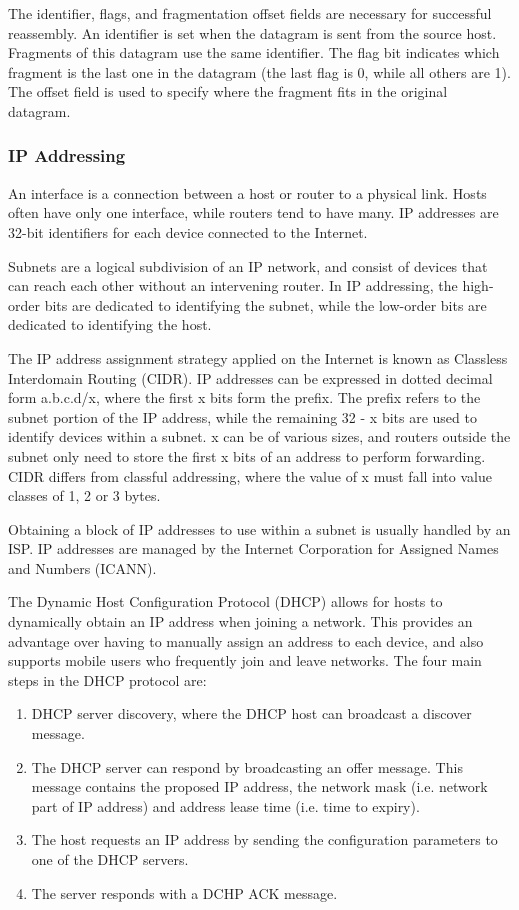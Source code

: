 \documentclass[12pt,titlepage]{article}
\begin{document}
        The identifier, flags, and fragmentation offset fields are necessary for successful reassembly. An identifier is set when the datagram is sent from
        the source host. Fragments of this datagram use the same identifier. The flag bit indicates which fragment is the last one in the datagram
        (the last flag is 0, while all others are 1). The offset field is used to specify where the fragment fits in the original datagram.

      \subsubsection{IP Addressing}
        An interface is a connection between a host or router to a physical link. Hosts often have only one interface, while routers tend to have many.
        IP addresses are 32-bit identifiers for each device connected to the Internet.

        Subnets are a logical subdivision of an IP network, and consist of devices that can reach each other without an intervening router. In IP addressing,
        the high-order bits are dedicated to identifying the subnet, while the low-order bits are dedicated to identifying the host.

        The IP address assignment strategy applied on the Internet is known as Classless Interdomain Routing (CIDR). IP addresses can be expressed in dotted
        decimal form a.b.c.d/x, where the first x bits form the prefix. The prefix refers to the subnet portion of the IP address, while the remaining
        32 - x bits are used to identify devices within a subnet. x can be of various sizes, and routers outside the subnet only need to store the first x bits
        of an address to perform forwarding. CIDR differs from classful addressing, where the value of x must fall into value classes of 1, 2 or 3 bytes.

        Obtaining a block of IP addresses to use within a subnet is usually handled by an ISP. IP addresses are managed by the Internet Corporation for
        Assigned Names and Numbers (ICANN).

        The Dynamic Host Configuration Protocol (DHCP) allows for hosts to dynamically obtain an IP address when joining a network. This provides an
        advantage over having to manually assign an address to each device, and also supports mobile users who frequently join and leave networks.
        The four main steps in the DHCP protocol are:
        \begin{enumerate}
          \item DHCP server discovery, where the DHCP host can broadcast a discover message.
          \item The DHCP server can respond by broadcasting an offer message. This message contains the proposed IP address, the network mask
          (i.e. network part of IP address) and address lease time (i.e. time to expiry).
          \item The host requests an IP address by sending the configuration parameters to one of the DHCP servers.
          \item The server responds with a DCHP ACK message.
        \end{enumerate}
\end{document}

